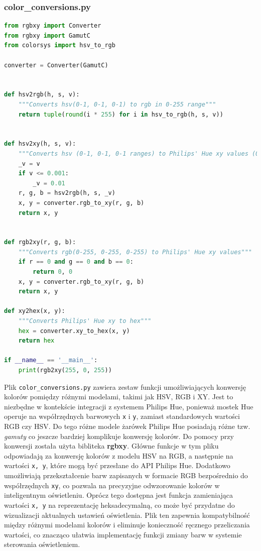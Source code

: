 \documentclass[12pt]{article}
\begin{document}
\subsubsection{color\_conversions.py}
\begin{lstlisting}[language=Python]
from rgbxy import Converter
from rgbxy import GamutC
from colorsys import hsv_to_rgb

converter = Converter(GamutC)


def hsv2rgb(h, s, v):
    """Converts hsv(0-1, 0-1, 0-1) to rgb in 0-255 range"""
    return tuple(round(i * 255) for i in hsv_to_rgb(h, s, v))


def hsv2xy(h, s, v):
    """Converts hsv (0-1, 0-1, 0-1 ranges) to Philips' Hue xy values (0-1, 0-1)"""
    _v = v
    if v <= 0.001:
        _v = 0.01
    r, g, b = hsv2rgb(h, s, _v)
    x, y = converter.rgb_to_xy(r, g, b)
    return x, y


def rgb2xy(r, g, b):
    """Converts rgb(0-255, 0-255, 0-255) to Philips' Hue xy values"""
    if r == 0 and g == 0 and b == 0:
        return 0, 0
    x, y = converter.rgb_to_xy(r, g, b)
    return x, y

def xy2hex(x, y):
    """Converts Philips' Hue xy to hex"""
    hex = converter.xy_to_hex(x, y)
    return hex

if __name__ == '__main__':
    print(rgb2xy(255, 0, 255))
\end{lstlisting}
Plik \texttt{color\_conversions.py} zawiera zestaw funkcji umożliwiających konwersję kolorów pomiędzy różnymi modelami, takimi jak HSV, RGB i XY. Jest to niezbędne w kontekście integracji
z systemem Philips Hue, ponieważ mostek Hue operuje na współrzędnych barwowych \texttt{x} i \texttt{y}, zamiast standardowych wartości RGB czy HSV. Do tego różne modele żarówek Philips Hue posiadają
różne tzw. \textit{gamuty} co jeszcze bardziej komplikuje konwersję kolorów. Do pomocy przy konwersji została użyta bibliteka \textbf{rgbxy}.
Główne funkcje w tym pliku odpowiadają za konwersję kolorów z modelu HSV na RGB, a następnie na wartości \texttt{x, y}, które mogą być przesłane do API Philips Hue. Dodatkowo umożliwiają
przekształcenie barw zapisanych w formacie RGB bezpośrednio do współrzędnych \texttt{xy}, co pozwala na precyzyjne odwzorowanie kolorów w inteligentnym oświetleniu. Oprócz tego dostępna jest
funkcja zamieniająca wartości \texttt{x, y} na reprezentację heksadecymalną, co może być przydatne do wizualizacji aktualnych ustawień oświetlenia. Plik ten zapewnia kompatybilność między
różnymi modelami kolorów i eliminuje konieczność ręcznego przeliczania wartości, co znacząco ułatwia implementację funkcji zmiany barw w systemie sterowania oświetleniem.
\end{document}

